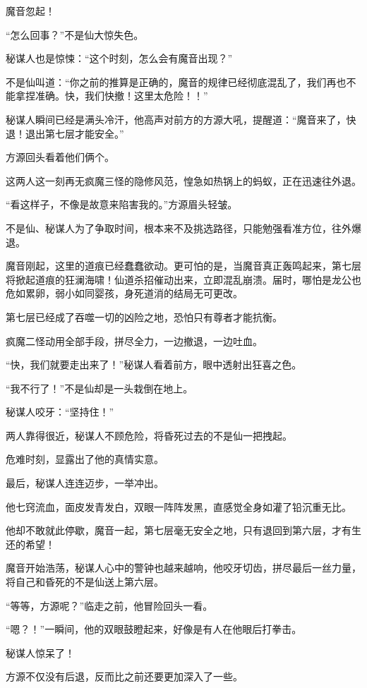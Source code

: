 \begin{this_body}
魔音忽起！

“怎么回事？”不是仙大惊失色。

秘谋人也是惊悚：“这个时刻，怎么会有魔音出现？”

不是仙叫道：“你之前的推算是正确的，魔音的规律已经彻底混乱了，我们再也不能拿捏准确。快，我们快撤！这里太危险！！”

秘谋人瞬间已经是满头冷汗，他高声对前方的方源大吼，提醒道：“魔音来了，快退！退出第七层才能安全。”

方源回头看着他们俩个。

这两人这一刻再无疯魔三怪的隐修风范，惶急如热锅上的蚂蚁，正在迅速往外退。

“看这样子，不像是故意来陷害我的。”方源眉头轻皱。

不是仙、秘谋人为了争取时间，根本来不及挑选路径，只能勉强看准方位，往外爆退。

魔音刚起，这里的道痕已经蠢蠢欲动。更可怕的是，当魔音真正轰鸣起来，第七层将掀起道痕的狂澜海啸！仙道杀招催动出来，立即混乱崩溃。届时，哪怕是龙公也危如累卵，弱小如同婴孩，身死道消的结局无可更改。

第七层已经成了吞噬一切的凶险之地，恐怕只有尊者才能抗衡。

疯魔二怪动用全部手段，拼尽全力，一边撤退，一边吐血。

“快，我们就要走出来了！”秘谋人看着前方，眼中透射出狂喜之色。

“我不行了！”不是仙却是一头栽倒在地上。

秘谋人咬牙：“坚持住！”

两人靠得很近，秘谋人不顾危险，将昏死过去的不是仙一把拽起。

危难时刻，显露出了他的真情实意。

最后，秘谋人连连迈步，一举冲出。

他七窍流血，面皮发青发白，双眼一阵阵发黑，直感觉全身如灌了铅沉重无比。

他却不敢就此停歇，魔音一起，第七层毫无安全之地，只有退回到第六层，才有生还的希望！

魔音开始浩荡，秘谋人心中的警钟也越来越响，他咬牙切齿，拼尽最后一丝力量，将自己和昏死的不是仙送上第六层。

“等等，方源呢？”临走之前，他冒险回头一看。

“嗯？！”一瞬间，他的双眼鼓瞪起来，好像是有人在他眼后打拳击。

秘谋人惊呆了！

方源不仅没有后退，反而比之前还要更加深入了一些。


\end{this_body}
